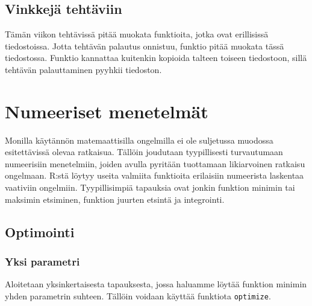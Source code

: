\documentclass[
]{book}
\newenvironment{Shaded}{\begin{snugshade}}{\end{snugshade}}
\newcommand{\AttributeTok}[1]{\textcolor[rgb]{0.77,0.63,0.00}{#1}}
\newcommand{\ConstantTok}[1]{\textcolor[rgb]{0.00,0.00,0.00}{#1}}
\newcommand{\FloatTok}[1]{\textcolor[rgb]{0.00,0.00,0.81}{#1}}
\newcommand{\FunctionTok}[1]{\textcolor[rgb]{0.00,0.00,0.00}{#1}}
\newcommand{\NormalTok}[1]{#1}
\newcommand{\SpecialCharTok}[1]{\textcolor[rgb]{0.00,0.00,0.00}{#1}}
\begin{document}
\hypertarget{vinkkejuxe4-tehtuxe4viin}{%
\section{Vinkkejä tehtäviin}\label{vinkkejuxe4-tehtuxe4viin}}

Tämän viikon tehtävissä pitää muokata funktioita, jotka ovat erillisissä tiedostoissa. Jotta tehtävän palautus onnistuu, funktio pitää muokata tässä tiedostossa. Funktio kannattaa kuitenkin kopioida talteen toiseen tiedostoon, sillä tehtävän palauttaminen pyyhkii tiedoston.

\hypertarget{numerical}{%
\chapter{Numeeriset menetelmät}\label{numerical}}

Monilla käytännön matemaattisilla ongelmilla ei ole suljetussa muodossa esitettävissä olevaa ratkaisua. Tällöin joudutaan tyypillisesti turvautumaan numeerisiin menetelmiin, joiden avulla pyritään tuottamaan likiarvoinen ratkaisu ongelmaan. R:stä löytyy useita valmiita funktioita erilaisiin numeerista laskentaa vaativiin ongelmiin. Tyypillisimpiä tapauksia ovat jonkin funktion minimin tai maksimin etsiminen, funktion juurten etsintä ja integrointi.

\hypertarget{optimointi}{%
\section{Optimointi}\label{optimointi}}

\hypertarget{yksi-parametri}{%
\subsection{Yksi parametri}\label{yksi-parametri}}

Aloitetaan yksinkertaisesta tapauksesta, jossa haluamme löytää funktion minimin yhden parametrin suhteen. Tällöin voidaan käyttää funktiota \texttt{optimize}.

\begin{Shaded}
\end{Shaded}
\end{document}

